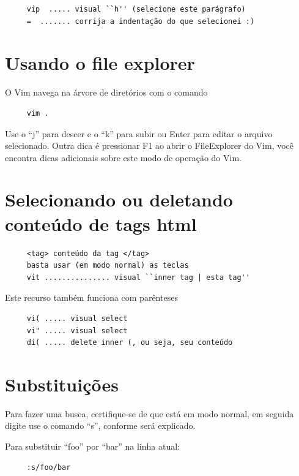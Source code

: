\documentclass[10pt,a4paper,openany]{book}
\begin{document}
\begin{verbatim}
     vip  ..... visual ``h'' (selecione este parágrafo)
     =  ....... corrija a indentação do que selecionei :)
\end{verbatim}

\section{Usando o file explorer}
\label{Usando o file explorer}
O Vim navega na árvore de diretórios com o comando

\begin{verbatim}
     vim .
\end{verbatim}

Use o ``j'' para descer e o ``k'' para subir ou Enter para editar o
arquivo selecionado. Outra dica é pressionar F1 ao abrir o
FileExplorer do Vim, você encontra dicas adicionais sobre este modo de
operação do Vim.

\section{Selecionando ou deletando conteúdo de tags html}
\label{Selecionando ou deletando conteúdo de tags html}

\begin{verbatim}
     <tag> conteúdo da tag </tag>
     basta usar (em modo normal) as teclas
     vit ............... visual ``inner tag | esta tag''
\end{verbatim}

Este recurso também funciona com parênteses

\begin{verbatim}
     vi( ..... visual select
     vi" ..... visual select
     di( ..... delete inner (, ou seja, seu conteúdo
\end{verbatim}


\section{Substituições }
\label{Substituições }

Para fazer uma busca, certifique-se de que está em modo normal, em
seguida digite use o comando ``s'', conforme será explicado.

Para substituir ``foo'' por ``bar'' na linha atual:

\begin{verbatim}
     :s/foo/bar
\end{verbatim}
\end{document}
